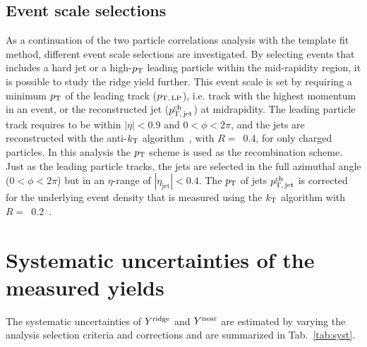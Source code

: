 \subsection{Event scale selections}
As a continuation of the two particle correlations analysis with the template fit method, different event scale selections are investigated. By selecting events that includes a hard jet or a high-$p_\mathrm{T}$ leading particle within the mid-rapidity region, it is possible to study the ridge yield further. This event scale is set by requiring a minimum $p_\mathrm{T}$ of the leading track ($p_\mathrm{T,\,LP}$), i.e. track with the highest momentum in an event, or the reconstructed jet ($p_\mathrm{T,\,jet}^\mathrm{ch}$) at midrapidity. The leading particle track requires to be within $|\eta|<0.9$ and $0<\phi<2\pi$, and the jets are reconstructed with the anti-$k_{\rm{T}}$ algorithm~\cite{Cacciari:2008gp,Cacciari:2011ma}, with $R=$~0.4, for only charged particles. In this analysis the $p_\mathrm{T}$ scheme is used as the recombination scheme. Just as the leading particle tracks, the jets are selected in the full azimuthal angle ($0<\phi<2\pi$) but in an $\eta$-range of $|\eta_\mathrm{jet}|<0.4$. The $p_\mathrm{T}$ of jets $p_\mathrm{T,\,jet}^\mathrm{ch}$ is corrected for the underlying event density that is measured using the $k_{\rm{T}}$ algorithm with $R=$~0.2~\cite{Acharya:2018eat}.





\section{Systematic uncertainties of the measured yields}
\label{sec:uncertainties}

The systematic uncertainties of $Y^{\rm{ridge}}$ and $Y^{\rm{near}}$ are estimated by varying the analysis selection criteria and corrections and are summarized in Tab.~\ref{tab:syst}.

